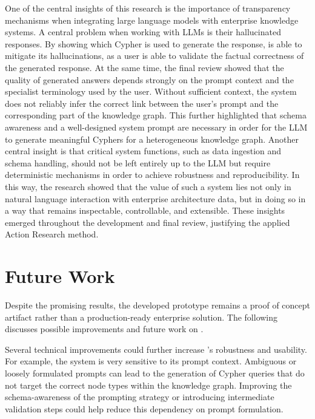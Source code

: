 One of the central insights of this research is the importance of transparency mechanisms when integrating large language models with enterprise knowledge systems. A central problem when working with LLMs is their hallucinated responses. By showing which Cypher is used to generate the response, \prototype{} is able to mitigate its hallucinations, as a user is able to validate the factual correctness of the generated response. At the same time, the final review showed that the quality of generated answers depends strongly on the prompt context and the specialist terminology used by the user. Without sufficient context, the system does not reliably infer the correct link between the user's prompt and the corresponding part of the knowledge graph. This further highlighted that schema awareness and a well-designed system prompt are necessary in order for the LLM to generate meaningful Cyphers for a heterogeneous knowledge graph. Another central insight is that critical system functions, such as data ingestion and schema handling, should not be left entirely up to the LLM but require deterministic mechanisms in order to achieve robustness and reproducibility. In this way, the research showed that the value of such a system lies not only in natural language interaction with enterprise architecture data, but in doing so in a way that remains inspectable, controllable, and extensible. These insights emerged throughout the development and final review, justifying the applied Action Research method.


\section{Future Work}
\label{sub:conclusion:futureWork}
Despite the promising results, the developed prototype remains a proof of concept artifact rather than a production-ready enterprise solution. The following discusses possible improvements and future work on \prototype{}.

Several technical improvements could further increase \prototype{}'s robustness and usability. For example, the system is very sensitive to its prompt context. Ambiguous or loosely formulated prompts can lead to the generation of Cypher queries that do not target the correct node types within the knowledge graph. Improving the schema-awareness of the prompting strategy or introducing intermediate validation steps could help reduce this dependency on prompt formulation.

